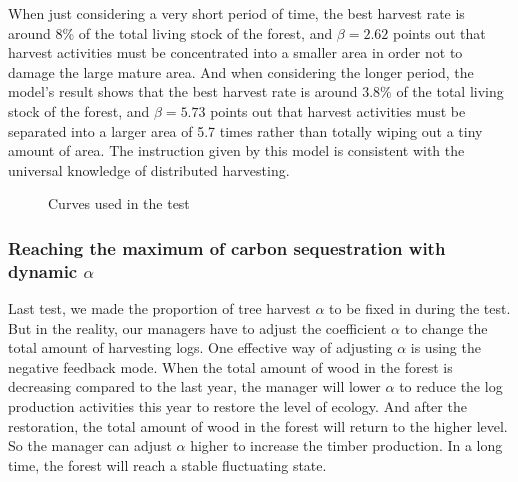 When just considering a very short period of time, the best harvest rate is around 8\% of the total living stock of the forest, and $\beta = 2.62$ points out that harvest activities must be concentrated into a smaller area in order not to damage the large mature area. And when considering the longer period, the model's result shows that the best harvest rate is around 3.8\% of the total living stock of the forest, and $\beta = 5.73$ points out that harvest activities must be separated into a larger area of 5.7 times rather than totally wiping out a tiny amount of area. The instruction given by this model is consistent with the universal knowledge of distributed harvesting. 

\begin{figure}[h]
    \centering
    \vspace{-1.5ex}
    \caption{Curves used in the test}
    \label{Curves used in the test}
\end{figure}

\subsubsection{Reaching the maximum of carbon sequestration with dynamic $\alpha$}

Last test, we made the proportion of tree harvest $\alpha$ to be fixed in during the test. 
But in the reality, our managers have to adjust the coefficient $\alpha$ to change the total amount of harvesting logs. 
One effective way of adjusting $\alpha$ is using the negative feedback mode. 
When the total amount of wood in the forest is decreasing compared to the last year, the manager will lower $\alpha$ to reduce the log production activities this year to restore the level of ecology. 
And after the restoration, the total amount of wood in the forest will return to the higher level. So the manager can adjust $\alpha$ higher to increase the timber production. 
In a long time, the forest will reach a stable fluctuating state.

